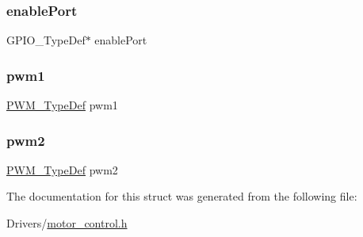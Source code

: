 \subsubsection{\texorpdfstring{enable\+Port}{enablePort}}
{\footnotesize\ttfamily G\+P\+I\+O\+\_\+\+Type\+Def$\ast$ enable\+Port}

\mbox{\label{struct_motor___type_def_ab6053993e6628cef7e5e202a05e6a0ac}} 
\subsubsection{\texorpdfstring{pwm1}{pwm1}}
{\footnotesize\ttfamily \hyperlink{struct_p_w_m___type_def}{P\+W\+M\+\_\+\+Type\+Def} pwm1}

\mbox{\label{struct_motor___type_def_afa92ea5c8db1b225b1c718099f986b8e}} 
\subsubsection{\texorpdfstring{pwm2}{pwm2}}
{\footnotesize\ttfamily \hyperlink{struct_p_w_m___type_def}{P\+W\+M\+\_\+\+Type\+Def} pwm2}



The documentation for this struct was generated from the following file\+:\begin{DoxyCompactItemize}
\item 
Drivers/\hyperlink{motor__control_8h}{motor\+\_\+control.\+h}\end{DoxyCompactItemize}
